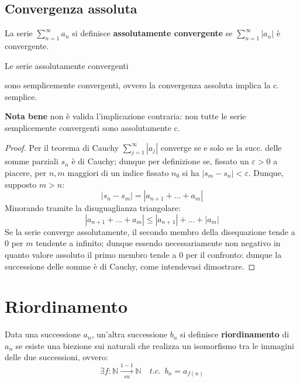 \documentclass[10pt, oneside]{book}
\theoremstyle{plain}
\begin{document}
\subsection{Convergenza assoluta}
\begin{defin}
La serie $\sum_{n=1}^{\infty} a_n$ si definisce \textbf{assolutamente convergente} se $\sum_{n=1}^{\infty} |a_n|$ è convergente.
\end{defin}
\begin{ther}
\hypertarget{assolutamente}{Le serie assolutamente convergenti} sono semplicemente convergenti, ovvero la convergenza assoluta implica la c. semplice.
\end{ther}
\textbf{Nota bene} non è valida l'implicazione contraria: non tutte le serie semplicemente convergenti sono assolutamente c.
\begin{proof}
Per il teorema di Cauchy $\sum_{j=1}^{\infty} |a_j|$ converge se e solo se la succ. delle somme parziali $s_n$ è di Cauchy; dunque per definizione se, fissato un $\varepsilon > 0$ a piacere, per $n, m$ maggiori di un indice fissato $n_0$ si ha $|s_m - s_n| < \varepsilon$. Dunque, supposto $m > n$:
\[|s_n - s_m| = |a_{n+1} + ... + a_m|\]
Minorando tramite la disuguaglianza triangolare: 
\[|a_{n+1} + ... + a_m| \leq |a_{n+1}| + ... + |a_m|\]
Se la serie converge assolutamente, il secondo membro della disequazione tende a 0 per $m$ tendente a infinito; dunque essendo necessariamente non negativo in quanto valore assoluto il primo membro tende a 0 per il confronto: dunque la successione delle somme è di Cauchy, come intendevasi dimostrare.
\end{proof}

\section{Riordinamento}
\begin{defin}
    Data una successione $a_n$, un'altra successione $b_n$ si definisce \textbf{riordinamento} di $a_n$ se esiste una biezione sui naturali che realizza un isomorfismo tra le immagini delle due successioni, ovvero:
    \[\exists f : \mathbb{N} \xrightarrow[su]{1-1} \mathbb{N} \quad t.c. \enspace b_n = a_{f(n)}\]
\end{defin}
\end{document}
